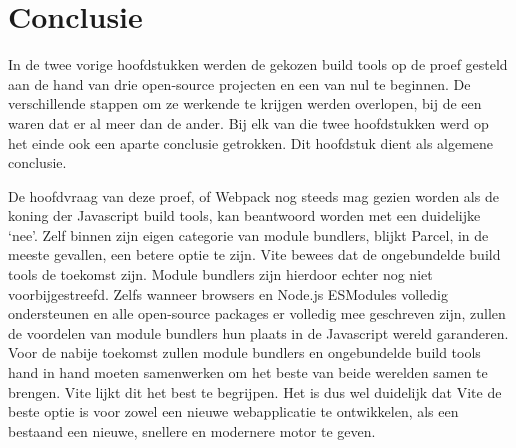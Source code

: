 \chapter{Conclusie}
\label{ch:conclusie}

In de twee vorige hoofdstukken werden de gekozen build tools op de proef gesteld aan de hand van drie open-source projecten en een van nul te beginnen. De verschillende stappen om ze werkende te krijgen werden overlopen, bij de een waren dat er al meer dan de ander. Bij elk van die twee hoofdstukken werd op het einde ook een aparte conclusie getrokken. Dit hoofdstuk dient als algemene conclusie. 

De hoofdvraag van deze proef, of Webpack nog steeds mag gezien worden als de koning der Javascript build tools, kan beantwoord worden met een duidelijke ‘nee’. Zelf binnen zijn eigen categorie van module bundlers, blijkt Parcel, in de meeste gevallen, een betere optie te zijn. Vite bewees dat de ongebundelde build tools de toekomst zijn. Module bundlers zijn hierdoor echter nog niet voorbijgestreefd. Zelfs wanneer browsers en Node.js ESModules volledig ondersteunen en alle open-source packages er volledig mee geschreven zijn, zullen de voordelen van module bundlers hun plaats in de Javascript wereld garanderen. Voor de nabije toekomst zullen module bundlers en ongebundelde build tools hand in hand moeten samenwerken om het beste van beide werelden samen te brengen. Vite lijkt dit het best te begrijpen. Het is dus wel duidelijk dat Vite de beste optie is voor zowel een nieuwe webapplicatie te ontwikkelen, als een bestaand een nieuwe, snellere en modernere motor te geven. 

